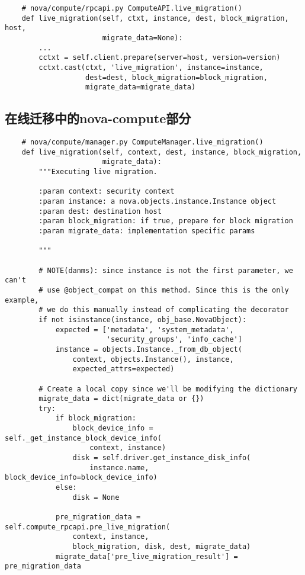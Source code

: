 \documentclass[a4paper,left=1.5cm,right=1.5cm,11pt]{article}
\begin{document}
    \begin{lstlisting}
    # nova/compute/rpcapi.py ComputeAPI.live_migration()
    def live_migration(self, ctxt, instance, dest, block_migration, host,
                       migrate_data=None):
        ...
        cctxt = self.client.prepare(server=host, version=version)
        cctxt.cast(ctxt, 'live_migration', instance=instance,
                   dest=dest, block_migration=block_migration,
                   migrate_data=migrate_data)
    \end{lstlisting}

\subsection{在线迁移中的nova-compute部分}
    \begin{lstlisting}
    # nova/compute/manager.py ComputeManager.live_migration()
    def live_migration(self, context, dest, instance, block_migration,
                       migrate_data):
        """Executing live migration.

        :param context: security context
        :param instance: a nova.objects.instance.Instance object
        :param dest: destination host
        :param block_migration: if true, prepare for block migration
        :param migrate_data: implementation specific params

        """

        # NOTE(danms): since instance is not the first parameter, we can't
        # use @object_compat on this method. Since this is the only example,
        # we do this manually instead of complicating the decorator
        if not isinstance(instance, obj_base.NovaObject):
            expected = ['metadata', 'system_metadata',
                        'security_groups', 'info_cache']
            instance = objects.Instance._from_db_object(
                context, objects.Instance(), instance,
                expected_attrs=expected)

        # Create a local copy since we'll be modifying the dictionary
        migrate_data = dict(migrate_data or {})
        try:
            if block_migration:
                block_device_info = self._get_instance_block_device_info(
                    context, instance)
                disk = self.driver.get_instance_disk_info(
                    instance.name, block_device_info=block_device_info)
            else:
                disk = None

            pre_migration_data = self.compute_rpcapi.pre_live_migration(
                context, instance,
                block_migration, disk, dest, migrate_data)
            migrate_data['pre_live_migration_result'] = pre_migration_data


\end{lstlisting}
\end{document}
